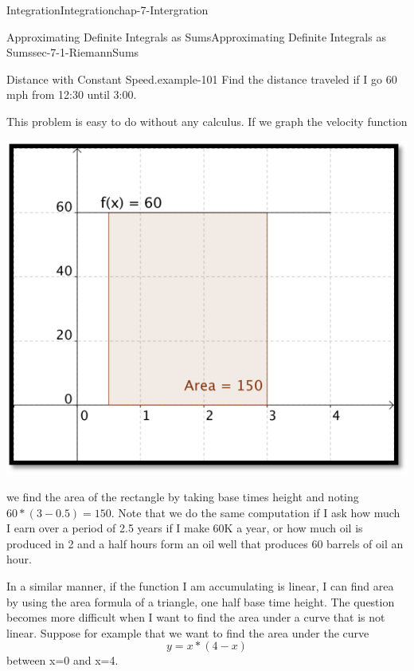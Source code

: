 \documentclass[oneside,10pt,]{book}
\numberwithin{equation}{section}
\begin{document}
\begin{chapterptx}{Integration}{}{Integration}{}{}{chap-7-Intergration}
\begin{sectionptx}{Approximating Definite Integrals as Sums}{}{Approximating Definite Integrals as Sums}{}{}{sec-7-1-RiemannSums}
\begin{example}{Distance with Constant Speed.}{example-101}
\hypertarget{p-2545}{}%
Find the distance traveled if I go 60 mph from 12:30 until 3:00.%
\par
\hypertarget{p-2546}{}%
This problem is easy to do without any calculus.  If we graph the velocity function%
\begin{sidebyside}{1}{0.2}{0.2}{0}%
\begin{sbspanel}{0.6}%
\includegraphics[width=1\linewidth]{images/sec7-1-1.png}
\end{sbspanel}%
\end{sidebyside}%
\par
\hypertarget{p-2547}{}%
we find the area of the rectangle by taking base times height and noting \(60*(3-0.5)=150\).  Note that we do the same computation if I ask how much I earn over a period of 2.5 years if I make \textdollar{}60K a year, or how much oil is produced in 2 and a half hours form an oil well that produces 60 barrels of oil an hour.%
\end{example}
\hypertarget{p-2548}{}%
In a similar manner, if the function I am accumulating is linear, I can find area by using the area formula of a triangle, one half base time height.  The question becomes more difficult when I want to find the area under a curve that is not linear.  Suppose for example that we want to find the area under the curve%
%
\begin{equation*}
y = x * (4-x)
\end{equation*}
\hypertarget{p-2549}{}%
between x=0 and x=4.%
\begin{sidebyside}{1}{0.2}{0.2}{0}%

\end{sidebyside}
\end{sectionptx}
\end{chapterptx}
\end{document}
